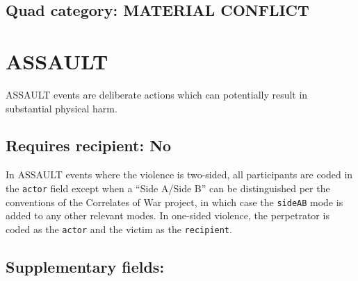 \documentclass[11pt]{report}
\newcommand{\plcat}[1]{\textsf{#1}}
\newcommand{\plmod}[1]{\texttt{#1}}
\newcommand{\txt}[1]{\texttt{#1}}
\begin{document}
 
\subsection{Quad category: MATERIAL CONFLICT}

\newpage  


\section{ASSAULT}

\plcat{ASSAULT} events are deliberate actions which can potentially result in substantial physical harm.

\subsection{Requires recipient: No}

In \plcat{ASSAULT} events where the violence is two-sided, all participants are coded in the \txt{actor} field except when a ``Side A/Side B'' can be distinguished per the conventions of the Correlates of War project, in which case the \plmod{sideAB} mode is added to any other relevant modes. In one-sided violence, the perpetrator is coded as the \txt{actor} and the victim as the \txt{recipient}.


\subsection{Supplementary fields:}
\end{document}
